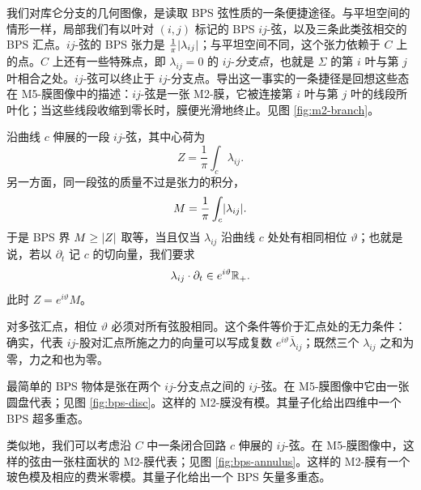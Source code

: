 我们对库仑分支的几何图像，是读取 BPS 弦性质的一条便捷途径。与平坦空间的情形一样，局部我们有以叶对 $(i,j)$ 标记的 BPS $ij$-弦，以及三条此类弦相交的 BPS 汇点。$ij$-弦的 BPS 张力是 $\frac{1}{\pi} \lvert \lambda_{ij} \rvert$；与平坦空间不同，这个张力依赖于 $C$ 上的点。$C$ 上还有一些特殊点，即 $\lambda_{ij} = 0$ 的 $ij$-\emph{分支点}，也就是 $\Sigma$ 的第 $i$ 叶与第 $j$ 叶相合之处。$ij$-弦可以终止于 $ij$-分支点。导出这一事实的一条捷径是回想这些态在 M5-膜图像中的描述：$ij$-弦是一张 M2-膜，它被连接第 $i$ 叶与第 $j$ 叶的线段所叶化；当这些线段收缩到零长时，膜便光滑地终止。见图 \ref{fig:m2-branch}。


沿曲线 $c$ 伸展的一段 $ij$-弦，其中心荷为
\begin{equation}\label{eq:Z-fragment}
Z = \frac{1}{\pi} \int_c \lambda_{ij}.
\end{equation}
另一方面，同一段弦的质量不过是张力的积分，
\begin{equation} \label{eq:stringmass}
M = \frac{1}{\pi} \int_c \lvert \lambda_{ij} \rvert.
\end{equation}
于是 BPS 界 $M \ge \lvert Z \rvert$ 取等，当且仅当 $\lambda_{ij}$ 沿曲线 $c$ 处处有相同相位 $\vartheta$；也就是说，若以 $\partial_t$ 记 $c$ 的切向量，我们要求
\begin{equation}\label{eq:BPS-WKB-curve}
\lambda_{ij} \cdot \partial_t \in e^{i \vartheta} \mathbb{R}_+.
\end{equation}
此时 $Z = e^{i \vartheta} M$。

对多弦汇点，相位 $\vartheta$ 必须对所有弦股相同。这个条件等价于汇点处的无力条件：确实，代表 $ij$-股对汇点所施之力的向量可以写成复数 $e^{i \vartheta} \bar{\lambda}_{ij}$；既然三个 $\lambda_{ij}$ 之和为零，力之和也为零。

最简单的 BPS 物体是张在两个 $ij$-分支点之间的 $ij$-弦。在 M5-膜图像中它由一张圆盘代表；见图 \ref{fig:bps-disc}。这样的 M2-膜没有模。其量子化给出四维中一个 BPS 超多重态。


类似地，我们可以考虑沿 $C$ 中一条闭合回路 $c$ 伸展的 $ij$-弦。在 M5-膜图像中，这样的弦由一张柱面状的 M2-膜代表；见图 \ref{fig:bps-annulus}。这样的 M2-膜有一个玻色模及相应的费米零模。其量子化给出一个 BPS 矢量多重态。

